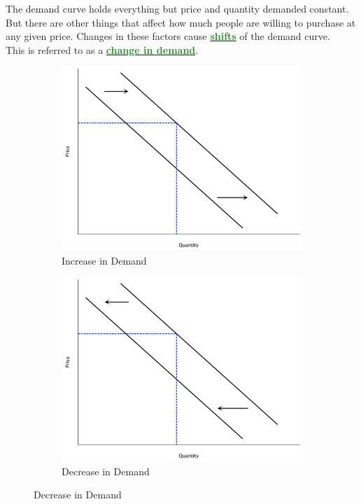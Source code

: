 \documentclass[11pt]{article}\usepackage[]{graphicx}\usepackage[]{color}
\theoremstyle{definition}
\newcommand{\blank}[1]{}
\newcommand{\dd}[1]{{\underline{\textbf{\textcolor{ForestGreen}{#1}}}}}
\begin{document}
	The demand curve holds everything but price and quantity demanded constant. But there are other things that affect how much people are willing to purchase at any given price. Changes in these factors cause \dd{shifts} of the demand curve. 
	\\
	
	This is referred to as a \dd{change in demand}.
	\blank{}
	\blank{}
	\blank{}
	\blank{}
	\blank{}
		

	
		\begin{figure}[H]
			\centering
			\caption{Shifts in Demand}
			\begin{subfigure}{.5\textwidth}
				\includegraphics[scale=.3]{plot9.pdf}
				\caption{Increase in Demand}
			\end{subfigure}%
			\begin{subfigure}{.5\textwidth}
				\centering
				\includegraphics[scale=.3]{plot10.pdf}
				\caption{Decrease in Demand}
			\end{subfigure}
		\end{figure}
	
\end{document}
